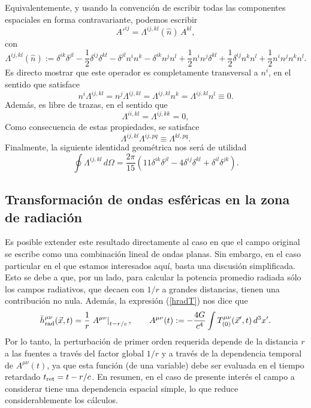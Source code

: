 Equivalentemente, y usando la convención de escribir todas las componentes espaciales en forma contravariante, podemos escribir
\begin{equation}
A'^{ij}=\Lambda^{ij,kl}(\hat{n})\,A^{kl},
\end{equation}
con
\begin{equation}
\Lambda^{ij,kl}(\hat{n}):=\delta^{ik}\delta^{jl}-\frac{1}{2}\delta^{ij}\delta^{kl}-\delta^{jl}n^in^k-\delta^{ik}n^jn^l
+\frac{1}{2}n^in^j\delta^{kl} +\frac{1}{2}\delta^{ij}n^kn^l +\frac{1}{2}n^in^jn^kn^l .
\end{equation}
Es directo mostrar que este operador es completamente transversal a $n^i$, en el sentido que satisface
\begin{equation}
n^i\Lambda^{ij,kl}=n^j\Lambda^{ij,kl}=\Lambda^{ij,kl}n^k=\Lambda^{ij,kl}n^l\equiv 0.
\end{equation}
Además, es libre de trazas, en el sentido que
\begin{equation}
\Lambda^{ii,kl}=\Lambda^{ij,kk}=0,
\end{equation}
Como consecuencia de estas propiedades, se satisface
\begin{equation}\label{LLL}
\Lambda^{ij,kl}\Lambda^{ij,pq}\equiv \Lambda^{kl,pq}.
\end{equation}
Finalmente, la siguiente identidad geométrica nos será de utilidad
\begin{equation}\label{intL}
\oint\Lambda^{ij,kl}\,d\Omega=\frac{2\pi}{15}\left(11\delta^{ik}\delta^{jl}-4\delta^{ij}\delta^{kl}+\delta^{il}\delta^{jk}\right).
\end{equation}

\subsection{Transformación de ondas esféricas en la zona de radiación}\label{sec:TOER}

Es posible extender este resultado directamente al caso en que el campo original se escribe como una combinación lineal de ondas planas. Sin embargo, en el caso particular en el que estamos interesados aquí, basta una discusión simplificada. Esto se debe a que, por un lado, para calcular la potencia promedio radiada sólo los campos radiativos, que decaen con $1/r$ a grandes distancias, tienen una contribución no nula. Además, la expresión (\ref{hradT}) nos dice que
\begin{equation}\label{hradf}
\bar{h}_{\rm rad}^{\mu\nu}(\vec{x},t)= \frac{1}{r}\left.A^{\mu\nu}\right|_{t-r/c}, \qquad A^{\mu\nu}(t):=-\frac{4G}{c^4}\int T^{\mu\nu}_{(0)}(\vec{x}',t)\, d^3x'.
\end{equation}
Por lo tanto, la perturbación de primer orden requerida depende de la distancia $r$ a las fuentes a través del factor global $1/r$ y a través de la dependencia temporal de $A^{\mu\nu}(t)$, ya que esta función (de una variable) debe ser evaluada en el tiempo retardado $t_{\rm ret}=t-r/c$. En resumen, en el caso de presente interés el campo a considerar tiene una dependencia espacial simple, lo que reduce considerablemente los cálculos.

